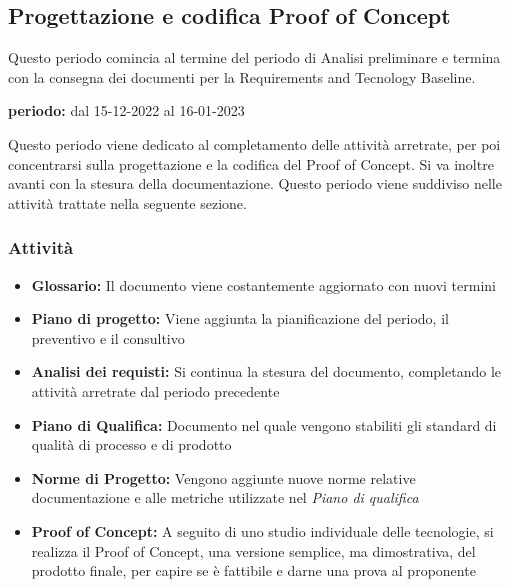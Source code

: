 \subsection{Progettazione e codifica Proof of Concept}
Questo periodo comincia al termine del periodo di Analisi preliminare e termina con la consegna dei documenti 
per la Requirements and Tecnology Baseline.\\
\begin{center}
\textbf{periodo:} dal 15-12-2022 al 16-01-2023\\
\end{center}
Questo periodo viene dedicato al completamento delle attività arretrate, per poi concentrarsi sulla 
progettazione e la codifica del Proof of Concept. Si va inoltre avanti con la stesura 
della documentazione. Questo periodo viene suddiviso nelle attività trattate nella seguente sezione.

\subsubsection{Attività}
\begin{itemize}
\item \textbf{Glossario:} Il documento viene costantemente aggiornato con nuovi termini
\item \textbf{Piano di progetto:} Viene aggiunta la pianificazione del periodo, il preventivo e il consultivo  
\item \textbf{Analisi dei requisti:} Si continua la stesura del documento, completando le attività arretrate dal periodo precedente
\item \textbf{Piano di Qualifica:} Documento nel quale vengono stabiliti gli standard di qualità di processo e di prodotto
\item \textbf{Norme di Progetto:} Vengono aggiunte nuove norme relative documentazione e alle metriche utilizzate nel \textit{Piano di qualifica}
\item \textbf{Proof of Concept:} A seguito di uno studio individuale delle tecnologie, si realizza il Proof of Concept, una versione semplice, ma dimostrativa, del prodotto finale, per 
capire se è fattibile e darne una prova al proponente
\end{itemize}

